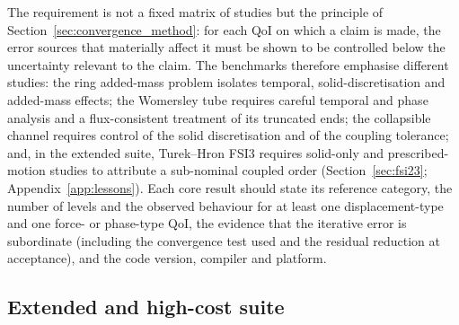 The requirement is not a fixed matrix of studies but the principle of Section~\ref{sec:convergence_method}: for each QoI on which a claim is made, the error sources that materially affect it must be shown to be controlled below the uncertainty relevant to the claim.
The benchmarks therefore emphasise different studies: the ring added-mass problem isolates temporal, solid-discretisation and added-mass effects; the Womersley tube requires careful temporal and phase analysis and a flux-consistent treatment of its truncated ends; the collapsible channel requires control of the solid discretisation and of the coupling tolerance; and, in the extended suite, Turek--Hron FSI3 requires solid-only and prescribed-motion studies to attribute a sub-nominal coupled order (Section~\ref{sec:fsi23}; Appendix~\ref{app:lessons}).
Each core result should state its reference category, the number of levels and the observed behaviour for at least one displacement-type and one force- or phase-type QoI, the evidence that the iterative error is subordinate (including the convergence test used and the residual reduction at acceptance), and the code version, compiler and platform.


\subsection{Extended and high-cost suite}\label{sec:extended_suite}

